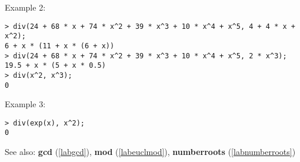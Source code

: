 \noindent Example 2: 
\begin{center}\begin{minipage}{15cm}\begin{Verbatim}[frame=single]
> div(24 + 68 * x + 74 * x^2 + 39 * x^3 + 10 * x^4 + x^5, 4 + 4 * x + x^2);
6 + x * (11 + x * (6 + x))
> div(24 + 68 * x + 74 * x^2 + 39 * x^3 + 10 * x^4 + x^5, 2 * x^3);
19.5 + x * (5 + x * 0.5)
> div(x^2, x^3);
0
\end{Verbatim}
\end{minipage}\end{center}
\noindent Example 3: 
\begin{center}\begin{minipage}{15cm}\begin{Verbatim}[frame=single]
> div(exp(x), x^2);
0
\end{Verbatim}
\end{minipage}\end{center}
See also: \textbf{gcd} (\ref{labgcd}), \textbf{mod} (\ref{labeuclmod}), \textbf{numberroots} (\ref{labnumberroots})
